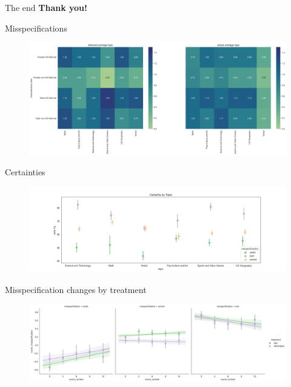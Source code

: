 \documentclass[aspectratio=169]{beamer}
\begin{document}
\begin{frame}{The end}
    \large\textbf{Thank you!}
\end{frame}

\appendix

\begin{frame}{Misspecifications}
    \label{misspecificationsheat}
    \begin{figure}
        \centering
        \includegraphics[scale=.3]{believed_actual_type_heat.png}
    \end{figure}
\end{frame}

\begin{frame}{Certainties}
    \label{certainties}
    \begin{figure}
        \centering
        \includegraphics[scale=.4]{certainty_by_topic.png}
    \end{figure}

\end{frame}

\begin{frame}{Misspecification changes by treatment}
    \label{misspecificationsrounds}
    \begin{figure}
        \centering
        \includegraphics[scale=.4]{misspecification_evolution_tratment.png}
    \end{figure}
\end{frame}
\end{document}
